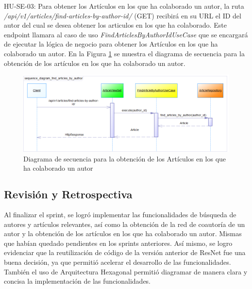 HU-SE-03: Para obtener los Artículos en los que ha colaborado un autor, la ruta \textit{/api/v1/articles/find-articles-by-author-id/} (GET) recibirá en su URL el ID del autor del cual se desea obtener los articulos en los que ha colaborado.
Este endpoint llamara al caso de uso \textit{FindArticlesByAuthorIdUseCase} que se encargará de ejecutar la lógica de negocio para obtener los Artículos en los que ha colaborado un autor.
En la Figura \ref{fig:sequence-diagram-find-articles-by-author-id} se muestra el diagrama de secuencia para la obtención de los artículos en los que ha colaborado un autor.
\begin{figure}[H]
    \centering
    \includegraphics[scale=0.7]{../02Figures/02Chapter/Sprints/Sprint-4/sequence_diagram_find_articles_by_author.png}
    \caption{Diagrama de secuencia para la obtención de los Artículos en los que ha colaborado un autor}
    \label{fig:sequence-diagram-find-articles-by-author-id}
\end{figure}

\subsection{Revisión y Retrospectiva}
Al finalizar el sprint, se logró implementar las funcionalidades de búsqueda de autores y artículos relevantes, así como la obtención de la red de coautoría de un autor y la obtención de los artículos en los que ha colaborado un autor.
Mismas que habían quedado pendientes en los sprints anteriores. 
Así mismo, se logro evidenciar que la reutilización de código de la versión anterior de ResNet fue una buena decisión, ya que permitió acelerar el desarrollo de las funcionalidades.
También el uso de Arquitectura Hexagonal permitió diagramar de manera clara y concisa la implementación de las funcionalidades.
